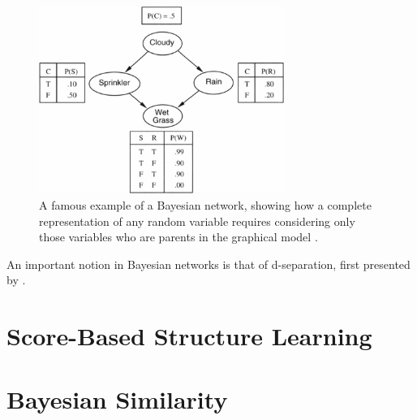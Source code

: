 \documentclass [11pt]{article}
\begin{document}
\begin{figure}[H]\label{fig:sprinkler}
\centering
\caption{A famous example of a Bayesian network, showing how a complete representation of any random variable requires considering only those variables who are parents in the graphical model \citep{norvig94}.}
\includegraphics[width=8cm]{sprinkler.jpg}
\end{figure}
An important notion in Bayesian networks is that of d-separation, first presented by \citet{pearl86}. 
\section{Score-Based Structure Learning}\label{ScoreBasedStructureLearning}
\section{Bayesian Similarity}\label{BayesianSimilarity}


\end{document}
